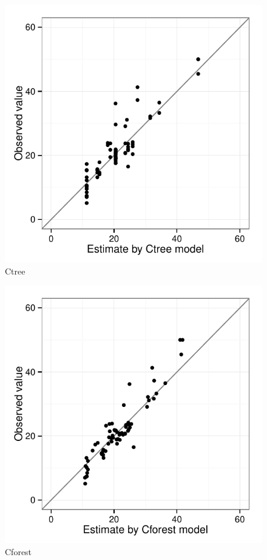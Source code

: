 \documentclass[10pt, letterpaper ]{article}
\begin{document}
\begin{minipage}{0.49\textwidth}
	\begin{figure}[H]
		\centering
		\includegraphics[width=\textwidth]{figures/ctree.pdf}
		\caption{Ctree}
	\end{figure}
\end{minipage}
\begin{minipage}{0.49\textwidth}
	\begin{figure}[H]
		\centering
		\includegraphics[width=\textwidth]{figures/cforest.pdf}
		\caption{Cforest}
	\end{figure}
\end{minipage}
\end{document}
